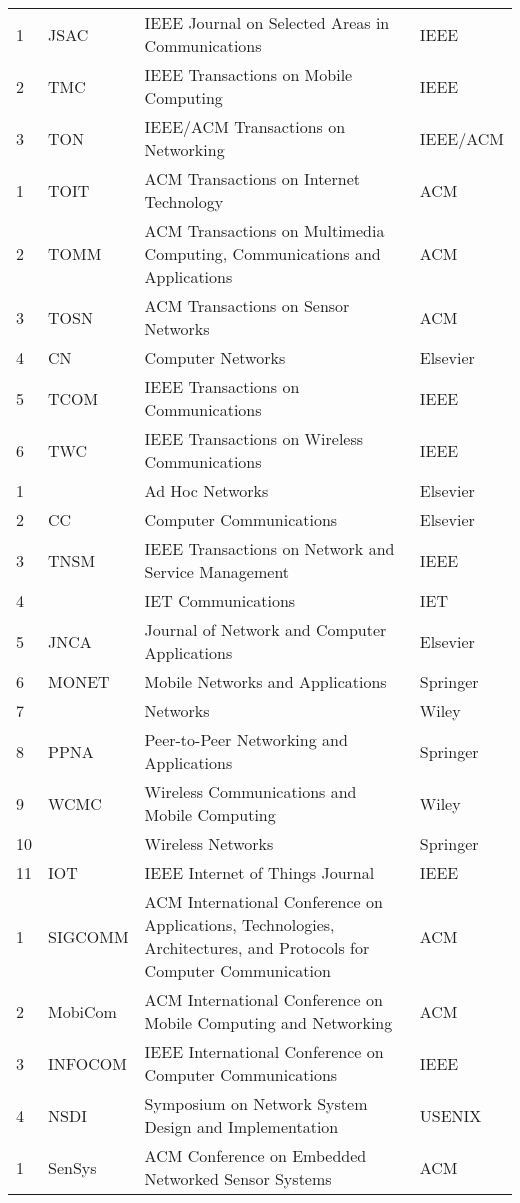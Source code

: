 \documentclass[doctor, vlined]{DissertUESTC}
\begin{document}
\begin{longtable}{p{2em} p{4.5em} p{20em} p{6em}}
		1 & JSAC & IEEE Journal on Selected Areas in Communications & IEEE \\
		2 & TMC & IEEE Transactions on Mobile Computing & IEEE \\
		3 & TON & IEEE/ACM Transactions on Networking & IEEE/ACM \\
		1 & TOIT & ACM Transactions on Internet Technology & ACM \\
		2 & TOMM & ACM Transactions on Multimedia Computing, Communications and Applications & ACM \\
		3 & TOSN & ACM Transactions on Sensor Networks & ACM \\
		4 & CN & Computer Networks & Elsevier \\
		5 & TCOM & IEEE Transactions on Communications & IEEE \\
		6 & TWC & IEEE Transactions on Wireless Communications & IEEE \\
		1 & & Ad Hoc Networks & Elsevier \\
		2 & CC & Computer Communications & Elsevier \\
		3 & TNSM & IEEE Transactions on Network and Service Management & IEEE \\
		4 & & IET Communications & IET \\
		5 & JNCA & Journal of Network and Computer Applications & Elsevier \\
		6 & MONET & Mobile Networks and Applications & Springer \\
		7 & & Networks & Wiley \\
		8 & PPNA & Peer-to-Peer Networking and Applications & Springer \\
		9 & WCMC & Wireless Communications and Mobile Computing & Wiley \\
		10 & & Wireless Networks & Springer \\
		11 & IOT & IEEE Internet of Things Journal & IEEE \\
		1 & SIGCOMM & ACM International Conference on Applications, Technologies, Architectures, and Protocols for Computer Communication & ACM \\
		2 & MobiCom & ACM International Conference on Mobile Computing and Networking & ACM \\
		3 & INFOCOM & IEEE International Conference on Computer Communications & IEEE \\
		4 & NSDI & Symposium on Network System Design and Implementation & USENIX \\
		1 & SenSys & ACM Conference on Embedded Networked Sensor Systems & ACM \\

\end{longtable}
\end{document}
